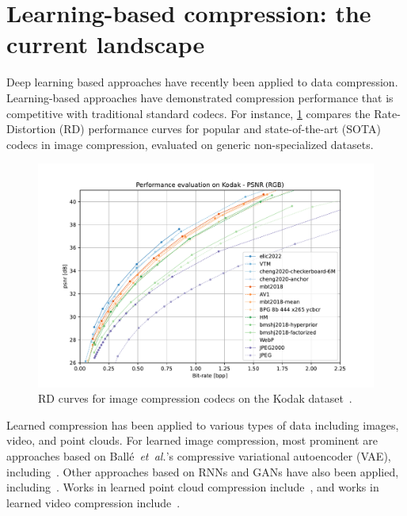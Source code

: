 \section{Learning-based compression: the current landscape}

Deep learning based approaches have recently been applied to data compression.
Learning-based approaches have demonstrated compression performance that is competitive with traditional standard codecs.
For instance, \cref{fig:intro/rd-curves} compares the Rate-Distortion (RD) performance curves for popular and state-of-the-art (SOTA) codecs in image compression, evaluated on generic non-specialized datasets.

\begin{figure}[htbp]
  \centering
  \includegraphics[width=\linewidth]{img/introduction/rd-curves-image-kodak-psnr-rgb.pdf}
  \caption[RD curves of all codecs on the Kodak dataset]{%
    RD curves for image compression codecs on the Kodak dataset~\cite{kodak_dataset}.%
  }
  \label{fig:intro/rd-curves}
\end{figure}


Learned compression has been applied to various types of data including images, video, and point clouds.
For learned image compression, most prominent are approaches based on Ballé~\emph{et~al.}'s compressive variational autoencoder (VAE), including~\cite{minnen2018joint,cheng2020learned,he2022elic}.
Other approaches based on RNNs and GANs have also been applied, including~\cite{toderici2017rnn,mentzer2020highfidelity}.
Works in learned point cloud compression include~\cite{yan2019deep,he2022density,pang2022graspnet,fu2022octattention,you2022ipdae}, and works in learned video compression include~\cite{rippel2019learned,agustsson2020scalespaceflow,hu2021fvc,ho2022canf}.

